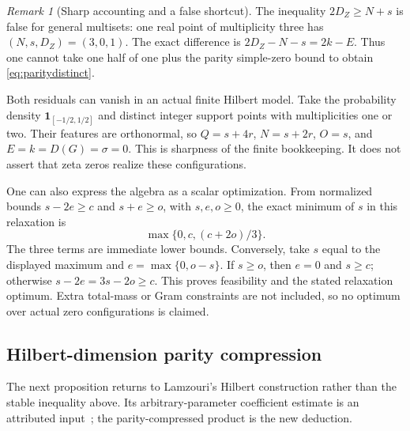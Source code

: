 \documentclass[11pt]{article}
\theoremstyle{remark}
\newtheorem{remark}[theorem]{Remark}
\begin{document}
\begin{remark}[Sharp accounting and a false shortcut]
The inequality $2D_Z\ge N+s$ is false for general multisets: one real
point of multiplicity three has $(N,s,D_Z)=(3,0,1)$. The exact difference
is $2D_Z-N-s=2k-E$. Thus one cannot take one half of one plus the parity
simple-zero bound to obtain \eqref{eq:paritydistinct}.

Both residuals can vanish in an actual finite Hilbert model. Take the
probability density $\mathbf1_{[-1/2,1/2]}$ and distinct integer support
points with multiplicities one or two. Their features are orthonormal,
so $Q=s+4r$, $N=s+2r$, $O=s$, and $E=k=D(G)=\sigma=0$.
This is sharpness of the finite bookkeeping. It does not assert that zeta
zeros realize these configurations.
\end{remark}

One can also express the algebra as a scalar optimization. From normalized
bounds $s-2e\ge c$ and $s+e\ge o$, with $s,e,o\ge0$, the exact minimum
of $s$ in this relaxation is
\begin{equation}\label{eq:relaxedLP}
 \max\{0,c,(c+2o)/3\}.
\end{equation}
The three terms are immediate lower bounds. Conversely, take $s$ equal
to the displayed maximum and $e=\max\{0,o-s\}$. If $s\ge o$, then
$e=0$ and $s\ge c$; otherwise $s-2e=3s-2o\ge c$. This proves
feasibility and the stated relaxation optimum. Extra total-mass or Gram
constraints are not included, so no optimum over actual zero configurations
is claimed.

\subsection{Hilbert-dimension parity compression}

The next proposition returns to Lamzouri's Hilbert construction rather than
the stable inequality above. Its arbitrary-parameter coefficient estimate is
an attributed input~\cite{Lamzouri,AF}; the parity-compressed product is the
new deduction.
\end{document}
